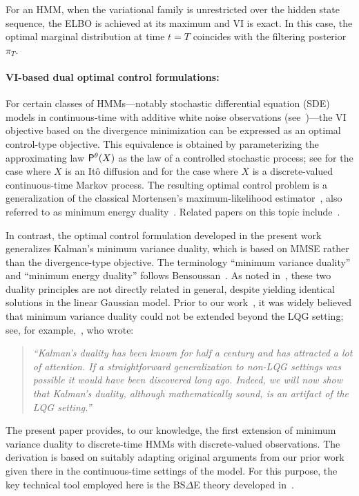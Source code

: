 \documentclass[twoside,11pt]{article}
\def\sP{{\sf P}}
\begin{document}
For an HMM, when the variational family is unrestricted over the
hidden state sequence, the ELBO is achieved at its maximum and VI is
exact. In this case, the optimal marginal
distribution at time $t=T$ coincides with the filtering posterior
$\pi_T$.


\paragraph{VI-based dual optimal control formulations:}
For certain classes of HMMs---notably stochastic differential
equation (SDE) models in continuous-time
with additive white noise observations
(see~\cite{xiong2008introduction})---the VI objective based on the
divergence minimization
can be expressed as an optimal control-type objective.
This equivalence is obtained by parameterizing the approximating law
$\sP^\theta(X)$ as the law of a controlled stochastic process; see
\cite[Sec.~3]{mitter2003} for the case where $X$ is an
It\^o diffusion and \cite[Sec.~2.2]{van2006filtering} for the case where
$X$ is a discrete-valued continuous-time Markov process.  
The resulting optimal control problem is a generalization of the
classical Mortensen's maximum-likelihood
estimator~\citep{mortensen1968}, also referred to as minimum
  energy duality~\citep{hijab1980minimum}.  
Related papers on this topic
include~\citep{todorov2008general,sutter2016variational,kim2020smoothing,raginsky2024variational}. 

In contrast, the optimal
control formulation developed in the present work generalizes
Kalman's minimum variance duality, which is based on MMSE
rather than the divergence-type objective. 
The terminology ``minimum variance duality” and ``minimum energy
duality” follows Bensoussan~\cite[p.~180]{bensoussan2018estimation}. As
noted in~\cite[p.~100]{kailath2000linear}, these two duality principles
are not directly related in general, despite yielding identical
solutions in the linear Gaussian model.
Prior to our work~\citep{kim2019duality}, it was widely believed that
minimum variance duality could not be extended beyond the LQG setting;
see, for example,~\cite{todorov2008general}, who wrote:
\begin{quote}\em
``Kalman's duality has been known for half a century and has attracted a
lot of attention. If a straightforward generalization to non-LQG
settings was possible it would have been discovered long ago. Indeed,
we will now show that Kalman's duality, although mathematically sound,
is an artifact of the LQG setting.''
\end{quote}
The present paper provides, to our knowledge, the first extension of
minimum variance duality to discrete-time HMMs with
discrete-valued observations. The derivation is based on suitably
adapting original arguments from our prior
work~\citep{kim2019approach,duality_jrnl_paper_II} given there in the
continuous-time settings of the model.  For this purpose, the key
technical tool employed here is the BS$\Delta$E theory developed
in~\citep{fukasawa2025backward}.  
\end{document}

